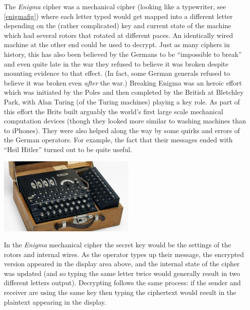 The \emph{Enigma} cipher was a mechanical cipher (looking like a
typewriter, see \cref{enigmafig}) where each letter typed would get
mapped into a different letter depending on the (rather complicated) key
and current state of the machine which had several rotors that rotated
at different paces. An identically wired machine at the other end could
be used to decrypt. Just as many ciphers in history, this has also been
believed by the Germans to be ``impossible to break'' and even quite
late in the war they refused to believe it was broken despite mounting
evidence to that effect. (In fact, some German generals refused to
believe it was broken even \emph{after} the war.) Breaking Enigma was an
heroic effort which was initiated by the Poles and then completed by the
British at Bletchley Park, with Alan Turing (of the Turing machines)
playing a key role. As part of this effort the Brits built arguably the
world's first large scale mechanical computation devices (though they
looked more similar to washing machines than to iPhones). They were also
helped along the way by some quirks and errors of the German operators.
For example, the fact that their messages ended with ``Heil Hitler''
turned out to be quite useful.

\begin{marginfigure}
\centering
\includegraphics[width=\linewidth, height=1.5in, keepaspectratio]{../figure/enigma.jpg}
\caption{In the \emph{Enigma} mechanical cipher the secret key would be
the settings of the rotors and internal wires. As the operator types up
their message, the encrypted version appeared in the display area above,
and the internal state of the cipher was updated (and so typing the same
letter twice would generally result in two different letters output).
Decrypting follows the same process: if the sender and receiver are
using the same key then typing the ciphertext would result in the
plaintext appearing in the display.}
\label{enigmafig}
\end{marginfigure}

